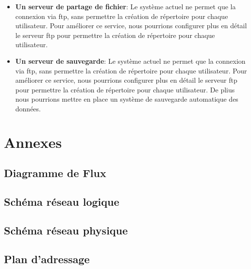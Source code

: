 \documentclass[a4paper,12pt]{report}
\begin{document}
            \begin{itemize}
                \item \textbf{Un serveur de partage de fichier}: Le système actuel ne permet que la connexion via ftp, sans permettre la création de répertoire pour chaque utilisateur. Pour améliorer ce service, nous pourrions configurer plus en détail le serveur ftp pour permettre la création de répertoire pour chaque utilisateur.
                \item \textbf{Un serveur de sauvegarde}: Le système actuel ne permet que la connexion via ftp, sans permettre la création de répertoire pour chaque utilisateur. Pour améliorer ce service, nous pourrions configurer plus en détail le serveur ftp pour permettre la création de répertoire pour chaque utilisateur. De plius nous pourrions mettre en place un système de sauvegarde automatique des données.
            \end{itemize} 
    \chapter*{Annexes}
        \section{Diagramme de Flux}
        \section{Schéma réseau logique}
        \section{Schéma réseau physique}
        \section{Plan d'adressage}
        
\end{document}
